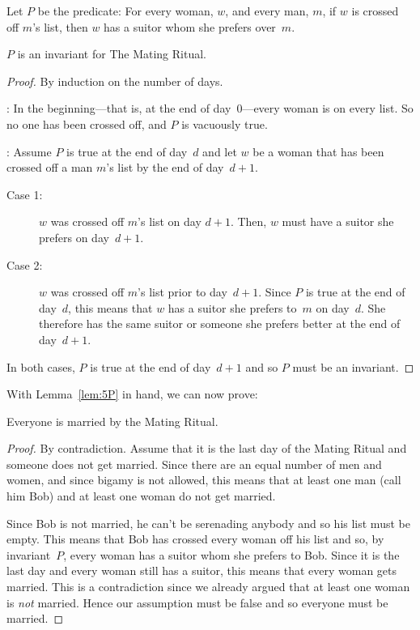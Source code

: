 \begin{definition}\label{def:P8}
Let $P$ be the predicate: For every woman, $w$, and every man, $m$, if
$w$ is crossed off $m$'s list, then $w$ has a suitor whom she prefers
over~$m$.
\end{definition}

\begin{lemma}\label{lem:5P}
$P$ is an invariant for The Mating Ritual.
\end{lemma}

\begin{proof}
By induction on the number of days.

: In the beginning---that is, at the end of
day~0---every woman is on every list.  So no one has been crossed off, and
$P$ is vacuously true.

: Assume $P$ is true at the end of
day~$d$ and let $w$ be a woman that has been crossed off a man $m$'s
list by the end of day~$d + 1$.

\begin{description}

\item[Case 1:]
$w$ was crossed off $m$'s list on day $d + 1$.  Then, $w$ must have a
  suitor she prefers on day~$d+1$.

\item[Case 2:]
$w$ was crossed off $m$'s list prior to day~$d+1$.  Since $P$ is true
  at the end of day~$d$, this means that $w$ has a suitor she prefers
  to~$m$ on day~$d$.  She therefore has the same suitor or someone she
  prefers better at the end of day~$d + 1$.

\end{description}
In both cases, $P$ is true at the end of day~$d + 1$ and so $P$ must
be an invariant.
\end{proof}

With Lemma~\ref{lem:5P} in hand, we can now prove:

\begin{theorem}
Everyone is married by the Mating Ritual.
\end{theorem}

\begin{proof}
By contradiction. Assume that it is the last day of the Mating Ritual
and someone does not get married.  Since there are an equal number of
men and women, and since bigamy is not allowed, this means that at
least one man (call him Bob) and at least one woman do not get
married.

Since Bob is not married, he can't be serenading anybody and so his
list must be empty.  This means that Bob has crossed every woman off
his list and so, by invariant~$P$, every woman has a suitor whom she
prefers to Bob.  Since it is the last day and every woman still has a
suitor, this means that every woman gets married.  This is a
contradiction since we already argued that at least one woman is
\emph{not} married.  Hence our assumption must be false and so
everyone must be married.
\end{proof}

